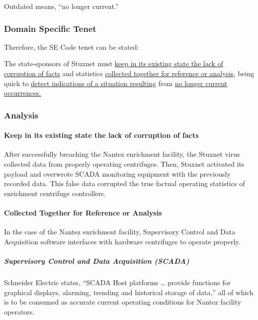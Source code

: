 \documentclass[12pt]{article}
\begin{document}
\begin{multicols}{2}
Outdated means, “no longer current.”\cite{merriamWebsterDefinitions}

\subsubsection{Domain Specific Tenet}

Therefore, the SE Code tenet can be stated:

\begin{framed}
The state-sponsors of Stuxnet must \ul{keep in its existing state the lack of corruption of facts} and statistics \ul{collected together for reference or analysis}, being quick to \ul{detect indications of a situation resulting} from \ul{no longer current occurrences.}
\end{framed}

\subsubsection{Analysis}

\paragraph{Keep in its existing state the lack of corruption of facts}

After successfully breaching the Nantez enrichment facility, the Stuxnet virus collected data from properly operating centrifuges. Then, Stuxnet activated its payload and overwrote SCADA monitoring equipment with the previously recorded data.\cite{lessonsFromStuxnet} This false data corrupted the true factual operating statistics of enrichment centrifuge controllers.

\paragraph{Collected Together for Reference or Analysis}

In the case of the Nantez enrichment facility, Supervisory Control and Data Acquisition software interfaces with hardware centrifuges to operate properly.

\subparagraph{Supervisory Control and Data Acquisition (SCADA)}

Schneider Electric states, “SCADA Host platforms … provide functions for graphical displays, alarming, trending and historical storage of data,” all of which is to be consumed as accurate current operating conditions for Nantez facility operators.\cite{schneiderElectric}


\end{multicols}
\end{document}
